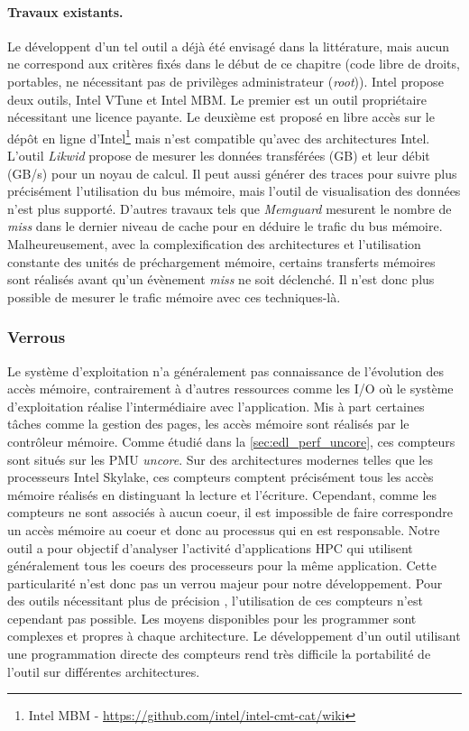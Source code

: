         
        \paragraph{Travaux existants.} Le développent d'un tel outil a déjà été envisagé dans la littérature, mais aucun ne correspond aux critères fixés dans le début de ce chapitre (code libre de droits, portables, ne nécessitant pas de privilèges administrateur (\textit{root})). 
        Intel propose deux outils, Intel VTune et Intel MBM. Le premier est un outil propriétaire nécessitant une licence payante. Le deuxième est proposé en libre accès sur le dépôt en ligne d'Intel\footnote{Intel MBM - \url{https://github.com/intel/intel-cmt-cat/wiki}} mais n'est compatible qu'avec des architectures Intel. 
        L'outil \textit{Likwid} propose de mesurer les données transférées (GB) et leur débit (GB/s) pour un noyau de calcul. Il peut aussi générer des traces pour suivre plus précisément l'utilisation du bus mémoire, mais l'outil de visualisation des données n'est plus supporté.
        D'autres travaux tels que \textit{Memguard}\cite{Yun2013} mesurent le nombre de \textit{miss} dans le dernier niveau de cache pour en déduire le trafic du bus mémoire. Malheureusement, avec la complexification des architectures et l'utilisation constante des unités de préchargement mémoire, certains transferts mémoires sont réalisés avant qu'un évènement \textit{miss} ne soit déclenché. Il n'est donc plus possible de mesurer le trafic mémoire avec ces techniques-là. 
        
           

    \subsubsection{Verrous}
        
        
        Le système d'exploitation n'a généralement pas connaissance de l'évolution des accès mémoire, contrairement à d'autres ressources comme les I/O où le système d'exploitation réalise l'intermédiaire avec l'application. Mis à part certaines tâches comme la gestion des pages, les accès mémoire sont réalisés par le contrôleur mémoire. Comme étudié dans la \autoref{sec:edl_perf_uncore}, ces compteurs sont situés sur les PMU \textit{uncore}. Sur des architectures modernes telles que les processeurs Intel Skylake, ces compteurs comptent précisément tous les accès mémoire réalisés en distinguant la lecture et  l'écriture. Cependant, comme les compteurs ne sont associés à aucun coeur, il est impossible de faire correspondre un accès mémoire au coeur et donc au processus qui en est responsable. Notre outil a pour objectif d'analyser l'activité d'applications HPC qui utilisent généralement tous les coeurs des processeurs pour la même application. Cette particularité n'est donc pas un verrou majeur pour notre développement. Pour des outils nécessitant plus de précision \cite{Larysch2016a}, l'utilisation de ces compteurs n'est cependant pas possible. Les moyens disponibles pour les programmer sont complexes et propres à chaque architecture. Le développement d'un outil utilisant une programmation directe des compteurs rend très difficile la portabilité de l'outil sur différentes architectures.
        
